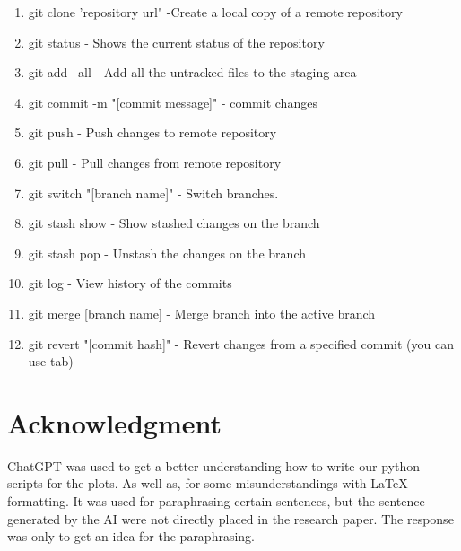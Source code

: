\documentclass[]{report}
\begin{document}
	\begin{enumerate}[leftmargin=*]
		\item git clone 'repository url" -Create a local copy of a remote repository
		
		\item git status - Shows the current status of the repository
		
		\item git add --all - Add all the untracked files to the staging area
		
		\item git commit -m "[commit message]" - commit changes
		
		\item git push - Push changes to remote repository
		
		\item git pull - Pull changes from remote repository
		
		\item git switch "[branch name]" - Switch branches.
		
		\item git stash show - Show stashed changes on the branch
		
		\item git stash pop - Unstash the changes on the branch
		
		\item git log - View history of the commits
		
		\item git merge [branch name] - Merge branch into the active branch
		
		\item git revert "[commit hash]" - Revert changes from a specified commit (you can use tab)
	\end{enumerate}
	
	\section{Acknowledgment}
	
	ChatGPT was used to get a better understanding how to write our python scripts for the plots. As well as, for some misunderstandings with LaTeX formatting. It was used for paraphrasing certain sentences, but the sentence generated by the AI were not directly placed in the research paper. The response was only to get an idea for the paraphrasing.	


\printbibliography[title=References]
\end{document}
